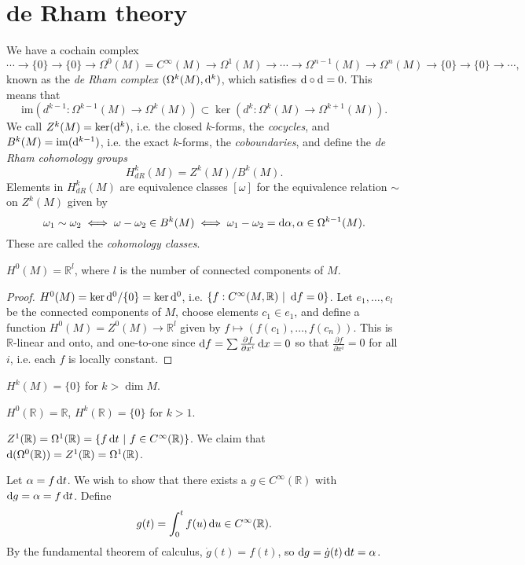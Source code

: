 \section{de Rham theory}
We have a cochain complex
$$
\cdots \to \{ 0 \} \to \{ 0 \} \to
\Omega^0(M) = C^\infty(M) \to
\Omega^1(M) \to \cdots \to
\Omega^{n-1}(M) \to
\Omega^n(M) \to
\{0\} \to \{0\} \to \cdots,
$$
known as the \emph{de Rham complex}
$(\Omega^k(M), \mathop{}\!\mathrm{d}^k)$, which satisfies $\mathop{}\!\mathrm{d} \circ \mathop{}\!\mathrm{d} = 0$.
This means that
$$
        \mathrm{im}(d^{k-1}: \Omega^{k-1}(M) \to \Omega^k(M))
\subset \ker(d^k : \Omega^k(M) \to \Omega^{k+1}(M)).
$$
We call $Z^k(M) = \ker(\mathop{}\!\mathrm{d}^k)$, i.e. the closed $k$-forms,
the \emph{cocycles}, and $B^k(M) = \mathrm{im}(\mathop{}\!\mathrm{d}^{k-1})$, i.e. the
exact $k$-forms, the \emph{coboundaries}, and define the
\emph{de Rham cohomology groups}
$$
  H^k_{dR}(M)
= Z^k(M) / B^k(M).
$$
Elements in $H^k_{dR}(M)$ are equivalence classes $[\omega]$ for the
equivalence relation $\sim$ on $Z^k(M)$ given by
$$
     \omega_1 \sim \omega_2
\iff \omega - \omega_2 \in B^k(M)
\iff \omega_1 - \omega_2 = \mathop{}\!\mathrm{d} \alpha, \alpha \in \Omega^{k-1}(M).
$$
These are called the \emph{cohomology classes}.

\begin{prop}
$H^0(M) = \mathbb{R}^l$, where $l$ is the number of connected
components of $M$.
\end{prop}

\begin{proof}
$H^0(M) = \ker \mathop{}\!\mathrm{d}^0 / \{ 0 \} = \ker \mathop{}\!\mathrm{d}^0$, i.e.
$\{ f : C^\infty(M, \mathbb{R}) ~\vert~ \mathop{}\!\mathrm{d} f = 0 \}$.
Let $e_1, \dots, e_l$ be the connected components of $M$,
choose elements $c_1 \in e_1$, and define a function
$H^0(M) = Z^0(M) \to \mathbb{R}^l$ given by
$f \mapsto (f(c_1), \dots, f(c_n))$. This is $\mathbb{R}$-linear and
onto, and one-to-one since
$\mathop{}\!\mathrm{d} f = \sum \frac{\partial f}{\partial x^i} \mathop{}\!\mathrm{d} x = 0$ so that
$\frac{\partial f}{\partial x^i} = 0$ for all $i$, i.e. each
$f$ is locally constant.
\end{proof}

\begin{remark}
$H^k(M) = \{ 0 \}$ for $k > \dim M$.
\end{remark}

\begin{xmpl}
$H^0(\mathbb{R}) = \mathbb{R}$, $H^k(\mathbb{R}) = \{ 0 \}$ for $k >
1$.

$Z^1(\mathbb{R}) = \Omega^1(\mathbb{R}) = \{ f \mathop{}\!\mathrm{d} t ~\vert~ f \in
C^\infty(\mathbb{R})\}$.
We claim that $\mathop{}\!\mathrm{d}(\Omega^0(\mathbb{R})) = Z^1(\mathbb{R}) =
\Omega^1(\mathbb{R})$.

Let $\alpha = f \mathop{}\!\mathrm{d} t$. We wish to show that there exists a
$g \in C^\infty(\mathbb{R})$ with $\mathop{}\!\mathrm{d} g = \alpha = f \mathop{}\!\mathrm{d} t$.
Define
$$
  g(t)
= \int_0^t
    f(u) \mathop{}\!\mathrm{d} u
\in C^\infty(\mathbb{R}).
$$
By the fundamental theorem of calculus, $\dot{g}(t) = f(t)$, so
$\mathop{}\!\mathrm{d} g = \dot{g}(t) \mathop{}\!\mathrm{d} t = \alpha$.
\end{xmpl}
